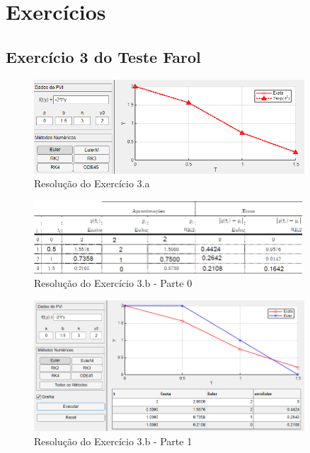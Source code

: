 \chapter{Exercícios}


\section*{Exercício 3 do Teste Farol}

\begin{figure}[H]
    \centering
    \includegraphics[width=0.9\textwidth]{Fotos/1farol3a}
    \caption{Resolução do Exercício 3.a}
    \label{fig:1farol3a}
\end{figure}

\begin{figure}[H]
    \centering
    \includegraphics[width=0.9\textwidth]{Fotos/1farol3b0}
    \caption{Resolução do Exercício 3.b - Parte 0}
    \label{fig:1farol3b0}
\end{figure}

\begin{figure}[H]
    \centering
    \includegraphics[width=0.9\textwidth]{Fotos/1farol3b1}
    \caption{Resolução do Exercício 3.b - Parte 1}
    \label{fig:1farol3b1}
\end{figure}

